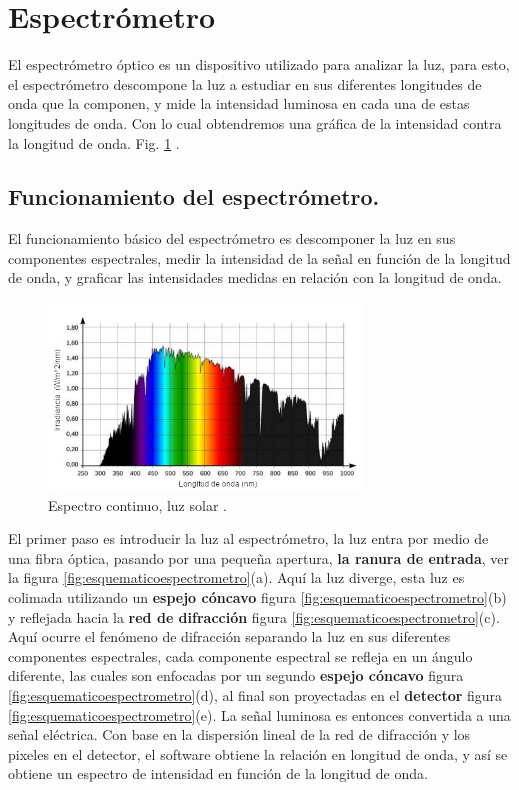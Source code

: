 \section{Espectrómetro}
El espectrómetro óptico es un dispositivo utilizado para analizar la luz, para esto, el espectrómetro descompone la luz a estudiar en sus diferentes longitudes de onda que la componen, y mide la intensidad luminosa en cada una de estas longitudes de onda. Con lo cual obtendremos una gráfica de la intensidad contra la longitud de onda. Fig. \ref{fig:espectrosol} \cite{B&WTek2016}. 

\subsection{Funcionamiento del espectrómetro.}
El funcionamiento básico del espectrómetro es descomponer la luz en sus componentes espectrales, medir la intensidad de la señal en función de la longitud de onda, y graficar las intensidades medidas en relación con la longitud de onda. 
\begin{figure}[h!]
	\centering
	\includegraphics[width=0.9\linewidth,height=5cm]{Imagenes/espectroSOL}
	\caption{Espectro continuo, luz solar \cite{SolarLight}.}
	\label{fig:espectrosol}
\end{figure}

El primer paso es introducir la luz al espectrómetro, la luz entra por medio de una fibra óptica, pasando por una pequeña apertura, \textbf{la ranura de entrada}, ver la figura \ref{fig:esquematicoespectrometro}(a). Aquí la luz diverge, esta luz es colimada utilizando un \textbf{espejo cóncavo} figura \ref{fig:esquematicoespectrometro}(b) y reflejada hacia la \textbf{red de difracción} figura \ref{fig:esquematicoespectrometro}(c). Aquí ocurre el fenómeno de difracción separando la luz en sus diferentes componentes espectrales, cada componente espectral se refleja en un ángulo diferente, las cuales son enfocadas por un segundo \textbf{espejo cóncavo} figura \ref{fig:esquematicoespectrometro}(d), al final son proyectadas en el \textbf{detector} figura \ref{fig:esquematicoespectrometro}(e). La señal luminosa es entonces convertida a una señal eléctrica. Con base en la dispersión lineal
de la red de difracción y los pixeles en el detector, el software obtiene la relación en
longitud de onda, y así se obtiene un espectro de intensidad en función de la longitud de onda.

